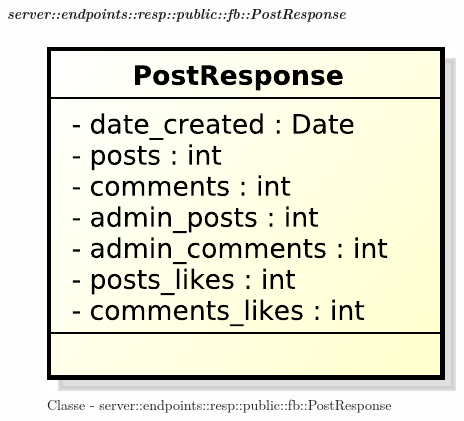     \subparagraph{server::endpoints::resp::public::fb::PostResponse} %
    \label{subp:bdsm_app_server_endpoints_resp_public_fb_postresponse}
  \begin{figure}[!htbp]
    \centering
    \centerline{\includegraphics[scale=0.6]{./images/server/classes/endpoints/fb/post_response.pdf}}
    \caption{Classe - server::endpoints::resp::public::fb::PostResponse}
  \end{figure}
